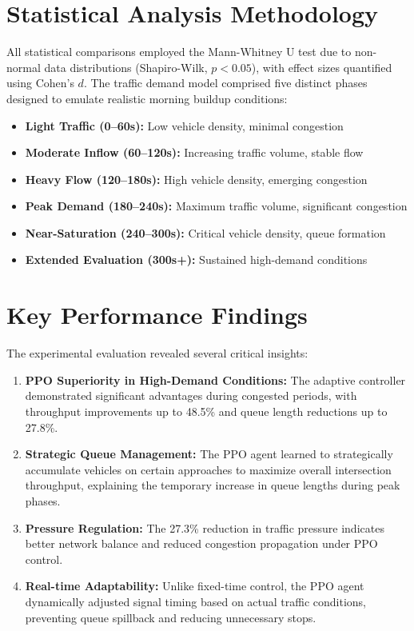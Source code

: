 \documentclass[11pt, a4paper]{report}
\begin{document}
\section{Statistical Analysis Methodology}

All statistical comparisons employed the Mann-Whitney U test due to non-normal data distributions (Shapiro-Wilk, $p < 0.05$), with effect sizes quantified using Cohen's $d$. The traffic demand model comprised five distinct phases designed to emulate realistic morning buildup conditions:

\begin{itemize}
    \item \textbf{Light Traffic (0--60s):} Low vehicle density, minimal congestion
    \item \textbf{Moderate Inflow (60--120s):} Increasing traffic volume, stable flow
    \item \textbf{Heavy Flow (120--180s):} High vehicle density, emerging congestion
    \item \textbf{Peak Demand (180--240s):} Maximum traffic volume, significant congestion
    \item \textbf{Near-Saturation (240--300s):} Critical vehicle density, queue formation
    \item \textbf{Extended Evaluation (300s+):} Sustained high-demand conditions
\end{itemize}

\section{Key Performance Findings}

The experimental evaluation revealed several critical insights:

\begin{enumerate}
    \item \textbf{PPO Superiority in High-Demand Conditions:} The adaptive controller demonstrated significant advantages during congested periods, with throughput improvements up to 48.5\% and queue length reductions up to 27.8\%.
    
    \item \textbf{Strategic Queue Management:} The PPO agent learned to strategically accumulate vehicles on certain approaches to maximize overall intersection throughput, explaining the temporary increase in queue lengths during peak phases.
    
    \item \textbf{Pressure Regulation:} The 27.3\% reduction in traffic pressure indicates better network balance and reduced congestion propagation under PPO control.
    
    \item \textbf{Real-time Adaptability:} Unlike fixed-time control, the PPO agent dynamically adjusted signal timing based on actual traffic conditions, preventing queue spillback and reducing unnecessary stops.
\end{enumerate}
\end{document}
